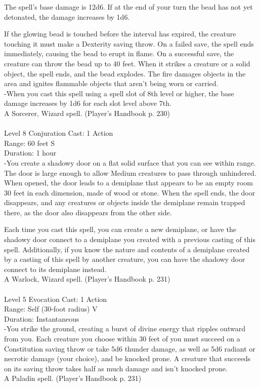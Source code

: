 \documentclass[10pt,twocolumn]{report}
\begin{document}
The spell’s base damage is 12d6. If at the end of your turn the bead has not yet detonated, the damage increases by 1d6. 

If the glowing bead is touched before the interval has expired, the creature touching it must make a Dexterity saving throw. On a failed save, the spell ends immediately, causing the bead to erupt in flame. On a successful save, the creature can throw the bead up to 40 feet. When it strikes a creature or a solid object, the spell ends, and the bead explodes. 
The fire damages objects in the area and ignites flammable objects that aren’t being worn or carried.\\
-When you cast this spell using a spell slot of 8th level or higher, the base damage increases by 1d6 for each slot level above 7th.\\
A Sorcerer, Wizard spell. (Player's Handbook p. 230) \\


 \\
Level 8 \quad Conjuration \quad Cast: 1 Action\\
Range: 60 feet \quad S\\
Duration: 1 hour \quad \\
-You create a shadowy door on a flat solid surface that you can see within range. 
The door is large enough to allow Medium creatures to pass through unhindered. When opened, the door leads to a demiplane that appears to be an empty room 30 feet in each dimension, made of wood or stone. When the spell ends, the door disappears, and any creatures or objects inside the demiplane remain trapped there, as the door also disappears from the other side. 

Each time you cast this spell, you can create a new demiplane, or have the shadowy door connect to a demiplane you created with a previous casting of this spell. Additionally, if you know the nature and contents of a demiplane created by a casting of  this spell by another creature, you can have the shadowy door connect to its demiplane instead.\\
A Warlock, Wizard spell. (Player's Handbook p. 231) \\


 \\
Level 5 \quad Evocation \quad Cast: 1 Action\\
Range: Self (30-foot radius) \quad V\\
Duration: Instantaneous \quad \\
-You strike the ground, creating a burst of divine energy that ripples outward from you. Each creature you choose within 30 feet of you must succeed on a Constitution saving throw or take 5d6 thunder damage, as well as 5d6 radiant or necrotic damage (your choice), and be knocked prone. A creature that succeeds on its saving throw takes half as much damage and isn’t knocked prone.\\
A Paladin spell. (Player's Handbook p. 231) \\
\end{document}
